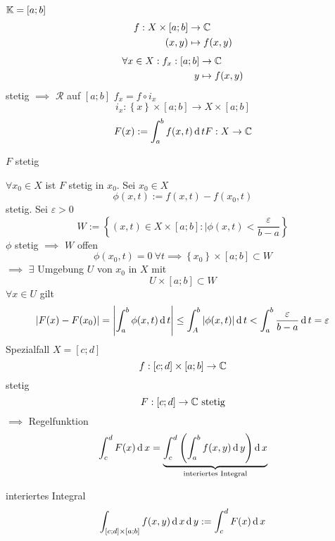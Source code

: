 \begin{Bem}
  $\mathbb{K}=[a;b]$
  \begin{align*}
    f:X\times[a;b]&\to\mathbb{C}\\
    (x,y)&\mapsto f(x,y)
  \end{align*}
  \begin{align*}
    \forall x\in X: f_x:[a;b]&\to\mathbb{C}\\
    y&\mapsto f(x,y)
  \end{align*}
  stetig $\implies$ $\mathcal{R}$ auf $[a;b]$
  $f_x=f\circ i_x$
  \[i_x:\left\{ x \right\}\times[a;b]\to X\times[a;b]\]
  \begin{gather*}
    F(x):=\int^b_af(x,t)\operatorname{d} t
    F:X\to\mathbb{C}
  \end{gather*}
\end{Bem}
\begin{Sat}
  $F$ stetig
\end{Sat}
\begin{Bew}
  $\forall x_0\in X$ ist $F$ stetig in $x_0$. Sei $x_0\in X$
  \[\phi(x,t):=f(x,t)-f(x_0,t)\]
  stetig. Sei $\varepsilon>0$
  \[W:=\left\{ (x,t)\in X\times[a;b]:|\phi(x,t)<\frac{\varepsilon}{b-a} \right\}\]
  $\phi$ stetig $\implies$ $W$ offen
  \[\phi(x_0,t)=0\ \forall t\implies \left\{ x_0 \right\}\times[a;b]\subset W\]
  $\implies$ $\exists$ Umgebung $U$ von $x_0$ in $X$ mit
  \[U\times [a;b]\subset W\]
  $\forall x\in U$ gilt
  \begin{gather*}
    \left| F(x)-F(x_0) \right|=\left| \int^b_a\phi(x,t)\operatorname{d} t \right|\leq \int^b_A\left| \phi(x,t) \right|\operatorname{d} t < \int^b_a\frac{\varepsilon}{b-a}\operatorname{d} t=\varepsilon
  \end{gather*}
  Spezialfall $X=[c;d]$
  \[f:[c;d]\times[a;b]\to\mathbb{C}\]
  stetig
  \[F:[c;d]\to\mathbb{C}\ \text{stetig}\]
  $\implies$ Regelfunktion
  \[\int^d_cF(x)\operatorname{d} x=\underbrace{\int^d_c\left( \int^b_af(x,y)\operatorname{d} y \right)\operatorname{d} x}_{\text{interiertes Integral}}\]
\end{Bew}
\begin{Not}{interiertes Integral}
  \[\int_{[c;d]\times[a;b]}f(x,y)\operatorname{d} x\operatorname{d} y:=\int_c^dF(x)\operatorname{d} x\]
\end{Not}
